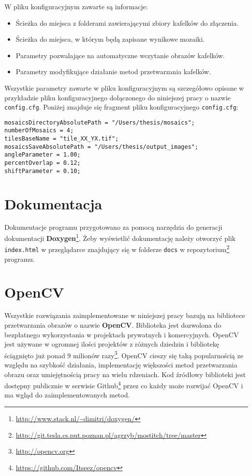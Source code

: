 W pliku konfiguracyjnym zawarte są informacje:

\begin{itemize}
\item Ścieżka do miejsca z folderami zawierającymi zbiory kafelków do złączenia.
\item Ścieżka do miejsca, w którym będą zapisane wynikowe mozaiki.
\item Parametry pozwalające na automatyczne wczytanie obrazów kafelków.
\item Parametry modyfikujące działanie metod przetwarzania kafelków.
\end{itemize}

Wszystkie parametry zawarte w pliku konfiguracyjnym są szczegółowo opisane w przykładzie pliku konfiguracyjnego dołączonego do niniejszej pracy o nazwie \texttt{config.cfg}. Poniżej znajduje się fragment pliku konfiguracyjnego \texttt{config.cfg}:

\begin{verbatim}
mosaicsDirectoryAbsolutePath = "/Users/thesis/mosaics";
numberOfMosaics = 4;
tilesBaseName = "tile_XX_YX.tif";
mosaicsSaveAbsolutePath = "/Users/thesis/output_images";
angleParameter = 1.00;
percentOverlap = 0.12;
shiftParameter = 0.10;
\end{verbatim}

\section{Dokumentacja}
\label{sec:oprogramowanie:dokumentacja}

Dokumentacje programu przygotowano za pomocą narzędzia do generacji dokumentacji \textbf{Doxygen}\footnote{\url{http://www.stack.nl/~dimitri/doxygen/}}. Żeby wyświetlić dokumentację należy otworzyć plik \texttt{index.html} w przeglądarce znajdujący się w folderze \texttt{docs} w repozytorium\footnote{\url{http://git.tesla.cs.put.poznan.pl/agrzyb/mostitch/tree/master}} programu.

\section{OpenCV}
\label{sec:oprogramowanie:opencv}

Wszystkie rozwiązania zaimplementowane w niniejszej pracy bazują na bibliotece przetwarzania obrazów o nazwie \textbf{OpenCV}. Biblioteka jest dozwolona do bezpłatnego wykorzystania w projektach prywatnych i komercyjnych. OpenCV jest używane w ogromnej ilości projektów z różnych dziedzin i bibliotekę ściągnięto już ponad 9 milionów razy\footnote{\url{http://opencv.org}}. OpenCV cieszy się taką popularnością ze względu na szybkość działania, implementację większości metod przetwarzania obrazu oraz umiejętnością pracy na wielu rdzeniach. Kod źródłowy biblioteki jest dostępny publicznie w serwisie Github\footnote{\url{https://github.com/Itseez/opencv}} przez co każdy może rozwijać OpenCV i ma wgląd do zaimplementowanych metod.
